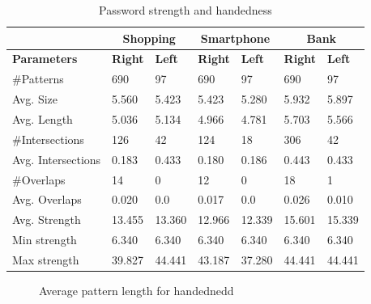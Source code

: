 		\begin{table}[H]
      \centering
      \begin{tabular}{l || l | l || l | l || l | l }
        \hline
         & \multicolumn{2}{c||}{\bf Shopping} & \multicolumn{2}{c||}{\bf Smartphone} &\multicolumn{2}{c}{\bf Bank} \\ \hline
        {\bf Parameters}   & {\bf Right} & {\bf Left} & {\bf Right} & {\bf Left} & {\bf Right} & {\bf Left}\\ \hline
        \#Patterns         & 690 		& 97 			& 690 		& 97 			& 690    & 97     \\
        Avg. Size          & 5.560 	& 5.423 	& 5.423 	& 5.280 	& 5.932  & 5.897  \\
        Avg. Length        & 5.036 	& 5.134 	& 4.966 	& 4.781 	& 5.703  & 5.566  \\
        \#Intersections    & 126 		& 42 			& 124  		& 18 			& 306    & 42     \\
        Avg. Intersections & 0.183 	& 0.433 	& 0.180 	& 0.186 	& 0.443  & 0.433  \\
        \#Overlaps         & 14 		& 0 			& 12 			& 0 			& 18     & 1      \\
        Avg. Overlaps      & 0.020 	& 0.0 		& 0.017 	& 0.0 		& 0.026  & 0.010  \\ \hline
        Avg. Strength      & 13.455 & 13.360 	& 12.966 	& 12.339 	& 15.601 & 15.339 \\ 
        Min strength       & 6.340 	& 6.340 	& 6.340 	& 6.340 	& 6.340  & 6.340  \\
        Max strength       & 39.827	& 44.441 	& 43.187 	& 37.280 	& 44.441 & 44.441 \\ \hline
      \end{tabular}
      \caption{Password strength and handedness}
      \label{tab:handednessstrength} 
    \end{table}

    \begin{figure}[H]
    	\centering
    	\caption{Average pattern length for handednedd}
    	\label{fig:avgpatternlengthhandedness}
    \end{figure}

